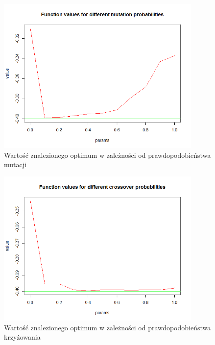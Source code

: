 \documentclass[11pt, a4paper]{article}
\begin{document}
\begin{figure}[H]
	\begin{center}
		\includegraphics[width=0.9\textwidth]{./assets/CosMix42.png} %
		\caption{Wartość znalezionego optimum w zależności od prawdopodobieństwa mutacji}
		\label{fig:gulf7}
	\end{center}
\end{figure}
\begin{figure}[H]
	\begin{center}
		\includegraphics[width=0.9\textwidth]{./assets/CosMix43.png} %
		\caption{Wartość znalezionego optimum w zależności od prawdopodobieństwa krzyżowania}
		\label{fig:gulf7}
	\end{center}
\end{figure}
\end{document}
